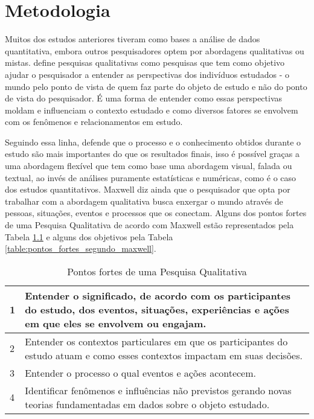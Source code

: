 \chapter{Metodologia}
\label{cap-metodologia}

Muitos dos estudos anteriores tiveram como bases a análise de dados quantitativa, embora outros pesquisadores optem por abordagens qualitativas ou mistas.  define pesquisas qualitativas como pesquisas que tem como objetivo ajudar o pesquisador a entender as perspectivas dos indivíduos estudados - o mundo pelo ponto de vista de quem faz parte do objeto de estudo e não do ponto de vista do pesquisador. É uma forma de entender como essas perspectivas moldam e influenciam o contexto estudado e como diversos fatores se envolvem com os fenômenos e relacionamentos em estudo. 

Seguindo essa linha,  defende que o processo e o conhecimento obtidos durante o estudo são mais importantes do que os resultados finais, isso é possível graças a uma abordagem flexível que tem como base uma abordagem visual, falada ou textual, ao invés de análises puramente estatísticas e numéricas, como é o caso dos estudos quantitativos. Maxwell diz ainda que o pesquisador que opta por trabalhar com a abordagem qualitativa busca enxergar o mundo através de pessoas, situações, eventos e processos que os conectam. Alguns dos pontos fortes de uma Pesquisa Qualitativa de acordo com Maxwell estão representados pela Tabela \ref{table:objetivos_intelectuais_segundo_maxwell} e alguns dos objetivos pela Tabela \ref{table:pontos_fortes_segundo_maxwell}.

\begin{table}[!htb]
	\centering
	\begin{tabular}{ | p{3cm} | p{12cm} | }
		\hline
		1 & Entender o significado, de acordo com os participantes do estudo, dos eventos, situações, experiências e ações em que eles se envolvem ou engajam. \\ \hline
		2 & Entender os contextos particulares em que os participantes do estudo atuam e como esses contextos impactam em suas decisões. \\ \hline
		3 & Entender o processo o qual eventos e ações acontecem. \\ \hline
		4 & Identificar fenômenos e influências não previstos gerando novas teorias fundamentadas em dados sobre o objeto estudado. \\ \hline
	\end{tabular}
	\caption{Pontos fortes de uma Pesquisa Qualitativa}
	\label{table:objetivos_intelectuais_segundo_maxwell}
\end{table}

